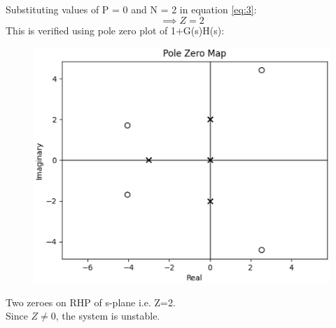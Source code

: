 \begin{enumerate}[label=\thesubsection.\arabic*.,ref=\thesubsection.\theenumi]
Substituting values of P = 0 and N = 2 in equation \ref{eq:3}:
\begin{equation}
 \implies Z = 2
\end{equation}
This is verified using pole zero plot of 1+G(s)H(s): \\
\begin{figure}[ht!]
    \includegraphics[width=\columnwidth]{./figs/ee18btech11025/pzG1.eps}
    \caption{}
    \label{fig:pz1}
\end{figure}
Two zeroes on RHP of s-plane i.e. Z=2. \\
Since $Z\neq0$, the system is unstable.
\end{enumerate}